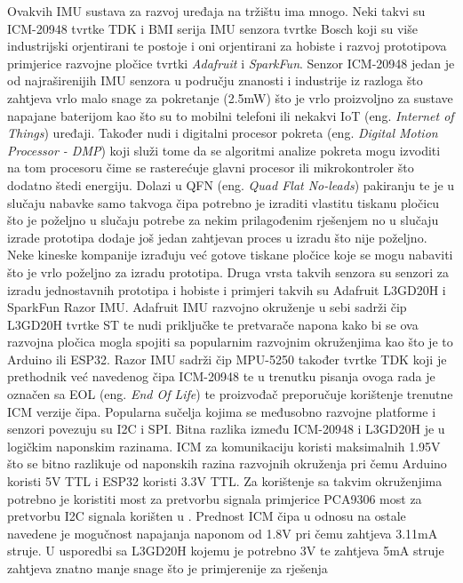 \documentclass[times, utf8, diplomski]{fer}
\begin{document}
Ovakvih IMU sustava za razvoj uređaja na tržištu ima mnogo. Neki takvi su ICM-20948 tvrtke TDK i BMI serija IMU senzora tvrtke
Bosch koji su više industrijski orjentirani te postoje i oni orjentirani za hobiste i razvoj prototipova primjerice razvojne pločice
tvrtki \textit{Adafruit} i \textit{SparkFun}. Senzor ICM-20948 jedan je od najraširenijih IMU senzora u području znanosti i
industrije iz razloga što zahtjeva vrlo malo snage za pokretanje (2.5mW) \citep{ICM} što je vrlo proizvoljno 
za sustave napajane baterijom kao što su to mobilni telefoni ili nekakvi IoT (eng. \textit{Internet of Things}) uređaji.
Također nudi i digitalni procesor pokreta (eng. \textit{Digital Motion Processor - DMP}) koji služi tome da se algoritmi analize
pokreta mogu izvoditi na tom procesoru čime se rasterećuje glavni procesor ili mikrokontroler što dodatno štedi energiju. Dolazi u
QFN (eng. \textit{Quad Flat No-leads}) pakiranju te je u slučaju nabavke samo takvoga čipa potrebno je izraditi vlastitu tiskanu
pločicu što je poželjno u slučaju potrebe za nekim prilagođenim rješenjem no u slučaju izrade prototipa dodaje još jedan zahtjevan
proces u izradu što nije poželjno. Neke kineske kompanije izrađuju već gotove tiskane pločice koje se mogu nabaviti što je vrlo
poželjno za izradu prototipa. Druga vrsta takvih senzora su senzori za izradu jednostavnih prototipa i hobiste i primjeri takvih su
Adafruit L3GD20H i SparkFun Razor IMU. Adafruit IMU razvojno okruženje u sebi sadrži čip L3GD20H tvrtke ST te nudi priključke te
pretvarače napona kako bi se ova razvojna pločica mogla spojiti sa popularnim razvojnim okruženjima kao što je to Arduino ili
ESP32. Razor IMU sadrži čip MPU-5250 također tvrtke TDK koji je prethodnik već navedenog čipa ICM-20948 te u trenutku pisanja
ovoga rada je označen sa EOL (eng. \textit{End Of Life}) te proizvođač preporučuje korištenje trenutne ICM verzije čipa.
Popularna sučelja kojima se međusobno razvojne platforme i senzori povezuju su I2C i SPI. Bitna razlika između ICM-20948 i L3GD20H
je u logičkim naponskim razinama. ICM za komunikaciju koristi maksimalnih 1.95V \citep{ICM} što se bitno razlikuje od naponskih
razina razvojnih okruženja pri čemu Arduino koristi 5V TTL i ESP32 koristi 3.3V TTL. Za korištenje sa takvim okruženjima potrebno je
koristiti most za pretvorbu signala primjerice PCA9306 most za pretvorbu I2C signala korišten u \cite{mini_data_capture}.
Prednost ICM čipa u odnosu na ostale navedene je mogučnost napajanja naponom od 1.8V pri čemu zahtjeva 3.11mA struje.
U usporedbi sa L3GD20H kojemu je potrebno 3V te zahtjeva 5mA struje zahtjeva znatno manje snage što je primjerenije za rješenja
\end{document}
